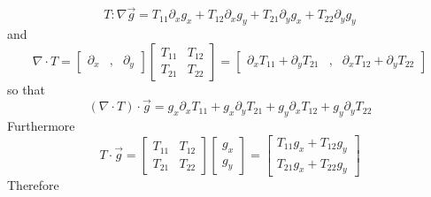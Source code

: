\documentclass[12pt, a4paper, twoside, openright]{book}
\begin{document}
\begin{equation}
T:\nabla \vec{g} = T_{11}\partial_x g_x + T_{12}\partial_x g_y + T_{21}\partial_y g_x
+ T_{22} \partial_y g_y
\end{equation}
and
\begin{equation}
\nabla \cdot T = 
\begin{bmatrix}
\partial_x & , & \partial_y
\end{bmatrix}
\begin{bmatrix}
T_{11} & T_{12} \\
T_{21} & T_{22}
\end{bmatrix} =
\begin{bmatrix}
\partial_x T_{11} + \partial_y T_{21} &,& \partial_x T_{12} + \partial_y T_{22}
\end{bmatrix}
\end{equation}
so that
\begin{equation}
(\nabla \cdot T) \cdot \vec{g} = 
g_x \partial_x T_{11} + g_x \partial_y T_{21} + g_y \partial_x T_{12}
 + g_y \partial_y T_{22}
\end{equation}
 Furthermore
\begin{equation}
T \cdot \vec{g} = 
\begin{bmatrix}
T_{11} & T_{12} \\
T_{21} & T_{22}
\end{bmatrix}
\begin{bmatrix}
g_x \\
g_y
\end{bmatrix} = 
\begin{bmatrix}
T_{11} g_x + T_{12} g_y \\
T_{21} g_x + T_{22} g_y
\end{bmatrix}
\end{equation}
Therefore
\end{document}
